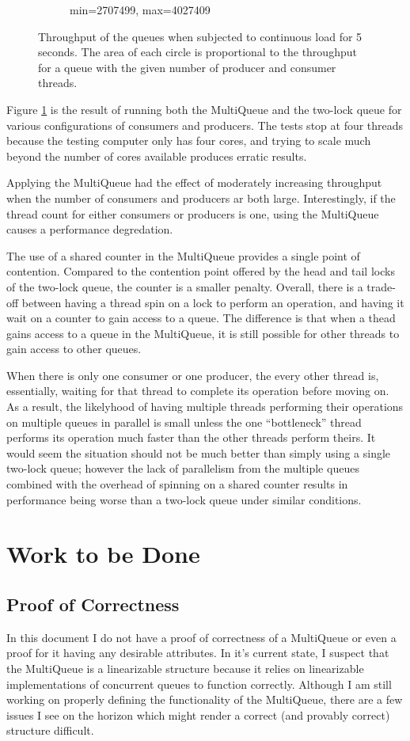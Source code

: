 \documentclass[12pt]{report}
\begin{document}
\begin{figure}[H]
\begin{subfigure}[b]{0.45\textwidth}
        \caption{min=2707499, max=4027409}
    \end{subfigure}
    \caption{Throughput of the queues when subjected to continuous load for 5
    seconds. The area of each circle is proportional to the throughput for a
    queue with the given number of producer and consumer threads.}
    \label{smalltest}
\end{figure}

Figure \ref{smalltest} is the result of running both the MultiQueue and the
two-lock queue for various configurations of consumers and producers. The tests
stop at four threads because the testing computer only has four cores, and
trying to scale much beyond the number of cores available produces erratic
results.

Applying the MultiQueue had the effect of moderately increasing throughput when
the number of consumers and producers ar both large. Interestingly, if the
thread count for either consumers or producers is one, using the MultiQueue
causes a performance degredation.

The use of a shared counter in the MultiQueue provides a single point of
contention. Compared to the contention point offered by the head and tail locks
of the two-lock queue, the counter is a smaller penalty. Overall, there is a
trade-off between having a thread spin on a lock to perform an operation, and
having it wait on a counter to gain access to a queue. The difference is that
when a thead gains access to a queue in the MultiQueue, it is still possible
for other threads to gain access to other queues.

When there is only one consumer or one producer, the every other thread is,
essentially, waiting for that thread to complete its operation before moving
on. As a result, the likelyhood of having multiple threads performing their
operations on multiple queues in parallel is small unless the one
``bottleneck'' thread performs its operation much faster than the other threads
perform theirs. It would seem the situation should not be much better than
simply using a single two-lock queue; however the lack of parallelism from the
multiple queues combined with the overhead of spinning on a shared counter
results in performance being worse than a two-lock queue under similar
conditions.


\section{Work to be Done}
\subsection{Proof of Correctness}
In this document I do not have a proof of correctness of a MultiQueue or even a
proof for it having any desirable attributes. In it's current state, I suspect
that the MultiQueue is a linearizable structure because it relies on
linearizable implementations of concurrent queues to function correctly.
Although I am still working on properly defining the functionality of the
MultiQueue, there are a few issues I see on the horizon which might render a
correct (and provably correct) structure difficult.
\end{document}
